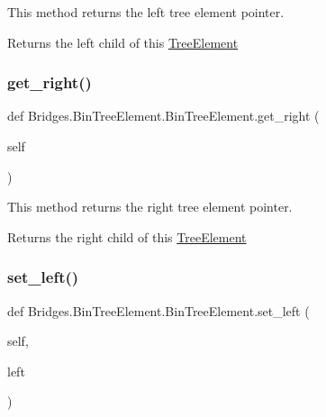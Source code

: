 This method returns the left tree element pointer. 

\begin{DoxyReturn}{Returns}
the left child of this \mbox{\hyperlink{namespace_bridges_1_1_tree_element}{Tree\+Element}} 
\end{DoxyReturn}
\mbox{\label{class_bridges_1_1_bin_tree_element_1_1_bin_tree_element_a3c013517d9600682363a4a8ee88dfc80}} 
\subsubsection{\texorpdfstring{get\+\_\+right()}{get\_right()}}
{\footnotesize\ttfamily def Bridges.\+Bin\+Tree\+Element.\+Bin\+Tree\+Element.\+get\+\_\+right (\begin{DoxyParamCaption}\item[{}]{self }\end{DoxyParamCaption})}



This method returns the right tree element pointer. 

\begin{DoxyReturn}{Returns}
the right child of this \mbox{\hyperlink{namespace_bridges_1_1_tree_element}{Tree\+Element}} 
\end{DoxyReturn}
\mbox{\label{class_bridges_1_1_bin_tree_element_1_1_bin_tree_element_aa3d0afa18e6b058b4b1d8625ca6eca9a}} 
\subsubsection{\texorpdfstring{set\+\_\+left()}{set\_left()}}
{\footnotesize\ttfamily def Bridges.\+Bin\+Tree\+Element.\+Bin\+Tree\+Element.\+set\+\_\+left (\begin{DoxyParamCaption}\item[{}]{self,  }\item[{}]{left }\end{DoxyParamCaption})}



